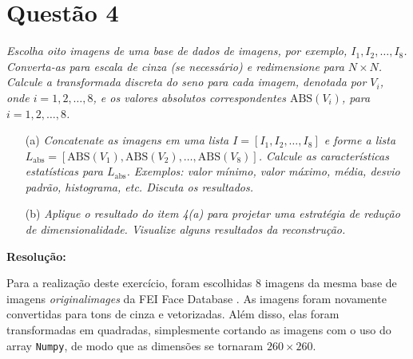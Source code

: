 \documentclass[a4paper, 11pt]{article}
\begin{document}

\section{Questão 4}

\textit{Escolha oito imagens de uma base de dados de imagens, por exemplo, \( I_1, I_2, \dots, I_8 \). Converta-as para escala de cinza (se necessário) e redimensione para \( N \times N \). Calcule a transformada discreta do seno para cada imagem, denotada por \( V_i \), onde \( i = 1, 2, \dots, 8 \), e os valores absolutos correspondentes \( \text{ABS}(V_i) \), para \( i = 1, 2, \dots, 8 \).}

\begin{itemize}
    \item[(a)] \textit{Concatenate as imagens em uma lista \( I = [I_1, I_2, \dots, I_8] \) e forme a lista \\ \( L_{\text{abs}} = [\text{ABS}(V_1), \text{ABS}(V_2), \dots, \text{ABS}(V_8)] \). Calcule as características estatísticas para \( L_{\text{abs}} \). Exemplos: valor mínimo, valor máximo, média, desvio padrão, histograma, etc. Discuta os resultados.}
    \item[(b)] \textit{Aplique o resultado do item 4(a) para projetar uma estratégia de redução de dimensionalidade. Visualize alguns resultados da reconstrução.}
\end{itemize}

\textbf{Resolução:}

Para a realização deste exercício, foram escolhidas 8 imagens da mesma base de imagens \textit{originalimages} da FEI Face Database \cite{FEI}. As imagens foram novamente convertidas para tons de cinza e vetorizadas. Além disso, elas foram transformadas em quadradas, simplesmente cortando as imagens com o uso do array \texttt{Numpy}, de modo que as dimensões se tornaram \( 260 \times 260 \).
\end{document}
